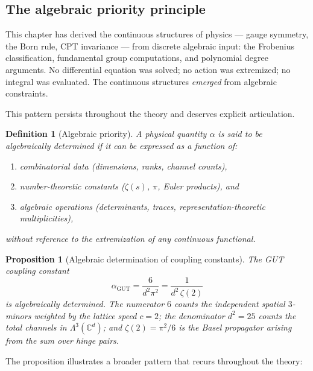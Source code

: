 \documentclass[12pt]{article}
\newtheorem{definition}[theorem]{Definition}
\newtheorem{proposition}[theorem]{Proposition}
\theoremstyle{remark}
\theoremstyle{definition}
\begin{document}
\subsection{The algebraic priority principle}
\label{sec:algebraic_priority}

This chapter has derived the continuous structures of physics --- gauge symmetry, the Born rule, CPT invariance --- from discrete algebraic input: the Frobenius classification, fundamental group computations, and polynomial degree arguments. No differential equation was solved; no action was extremized; no integral was evaluated. The continuous structures \emph{emerged} from algebraic constraints.

This pattern persists throughout the theory and deserves explicit articulation.

\begin{definition}[Algebraic priority]
\label{def:algebraic_priority}
A physical quantity $\alpha$ is said to be \emph{algebraically determined} if it can be expressed as a function of:
\begin{enumerate}
\item combinatorial data (dimensions, ranks, channel counts),
\item number-theoretic constants ($\zeta(s)$, $\pi$, Euler products), and
\item algebraic operations (determinants, traces, representation-theoretic multiplicities),
\end{enumerate}
without reference to the extremization of any continuous functional.
\end{definition}

\begin{proposition}[Algebraic determination of coupling constants]
\label{prop:alpha_algebraic}
The GUT coupling constant
\begin{equation}
\alpha_{\mathrm{GUT}} = \frac{6}{d^2 \pi^2} = \frac{1}{d^2\,\zeta(2)}
\end{equation}
is algebraically determined. The numerator $6$ counts the independent spatial $3$-minors weighted by the lattice speed $c = 2$; the denominator $d^2 = 25$ counts the total channels in $\Lambda^3(\mathbb{C}^d)$; and $\zeta(2) = \pi^2/6$ is the Basel propagator arising from the sum over hinge pairs.
\end{proposition}

The proposition illustrates a broader pattern that recurs throughout the theory:
\end{document}
